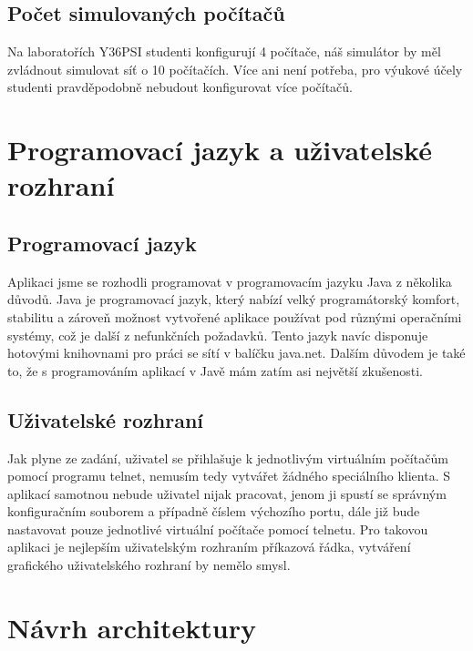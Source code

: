 \subsection{Počet simulovaných počítačů}

Na laboratořích Y36PSI studenti konfigurují 4 počítače, náš simulátor by měl zvládnout simulovat síť o 10 počítačích. Více ani není potřeba, pro výukové účely studenti pravděpodobně nebudout konfigurovat více počítačů.




\section{Programovací jazyk a uživatelské rozhraní}

\subsection{Programovací jazyk}
Aplikaci jsme se rozhodli programovat v programovacím jazyku Java z několika důvodů. Java je programovací jazyk, který nabízí velký programátorský komfort, stabilitu a zároveň možnost vytvořené aplikace používat pod různými operačními systémy, což je další z nefunkčních požadavků. Tento jazyk navíc disponuje hotovými knihovnami pro práci se sítí v balíčku java.net. Dalším důvodem je také to, že s programováním aplikací v Javě mám zatím asi největší zkušenosti.

\subsection{Uživatelské rozhraní}

Jak plyne ze zadání, uživatel se přihlašuje k jednotlivým virtuálním počítačům pomocí programu telnet, nemusím tedy vytvářet žádného speciálního klienta. S aplikací samotnou nebude uživatel nijak pracovat, jenom ji spustí se správným konfiguračním souborem a případně číslem výchozího portu, dále již bude nastavovat pouze jednotlivé virtuální počítače pomocí telnetu. Pro takovou aplikaci je nejlepším uživatelským rozhraním příkazová řádka, vytváření grafického uživatelského rozhraní by nemělo smysl.




\section{Návrh architektury}

